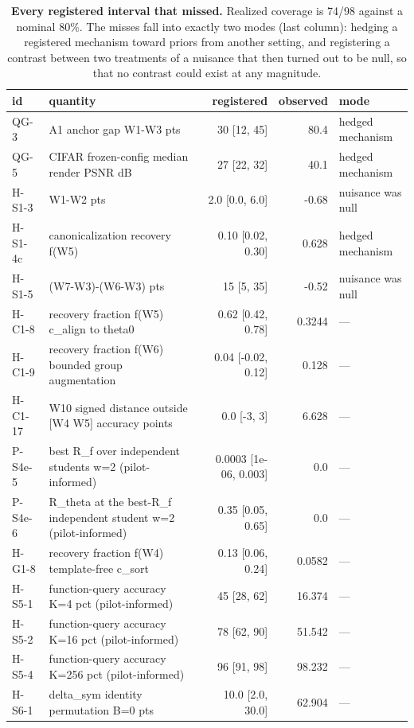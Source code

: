 \begin{table}[t]
\centering\small
\caption{\textbf{Every registered interval that missed.} Realized coverage is 74/98 against a nominal 80\%. The misses fall into exactly two modes (last column): hedging a registered mechanism toward priors from another setting, and registering a contrast between two treatments of a nuisance that then turned out to be null, so that no contrast could exist at any magnitude.}
\label{tab:calibration}
\begin{tabular}{@{}llrrl@{}}
\toprule
id & quantity & registered & observed & mode \\
\midrule
QG-3 & A1 anchor gap W1-W3 pts & 30 [12, 45] & 80.4 & hedged mechanism \\
QG-5 & CIFAR frozen-config median render PSNR dB & 27 [22, 32] & 40.1 & hedged mechanism \\
H-S1-3 & W1-W2 pts & 2.0 [0.0, 6.0] & -0.68 & nuisance was null \\
H-S1-4c & canonicalization recovery f(W5) & 0.10 [0.02, 0.30] & 0.628 & hedged mechanism \\
H-S1-5 & (W7-W3)-(W6-W3) pts & 15 [5, 35] & -0.52 & nuisance was null \\
H-C1-8 & recovery fraction f(W5) c\_align to theta0 & 0.62 [0.42, 0.78] & 0.3244 & --- \\
H-C1-9 & recovery fraction f(W6) bounded group augmentation & 0.04 [-0.02, 0.12] & 0.128 & --- \\
H-C1-17 & W10 signed distance outside [W4 W5] accuracy points & 0.0 [-3, 3] & 6.628 & --- \\
P-S4e-5 & best R\_f over independent students w=2 (pilot-informed) & 0.0003 [1e-06, 0.003] & 0.0 & --- \\
P-S4e-6 & R\_theta at the best-R\_f independent student w=2 (pilot-informed) & 0.35 [0.05, 0.65] & 0.0 & --- \\
H-G1-8 & recovery fraction f(W4) template-free c\_sort & 0.13 [0.06, 0.24] & 0.0582 & --- \\
H-S5-1 & function-query accuracy K=4 pct (pilot-informed) & 45 [28, 62] & 16.374 & --- \\
H-S5-2 & function-query accuracy K=16 pct (pilot-informed) & 78 [62, 90] & 51.542 & --- \\
H-S5-4 & function-query accuracy K=256 pct (pilot-informed) & 96 [91, 98] & 98.232 & --- \\
H-S6-1 & delta\_sym identity permutation B=0 pts & 10.0 [2.0, 30.0] & 62.904 & --- \\

\end{tabular}
\end{table}
